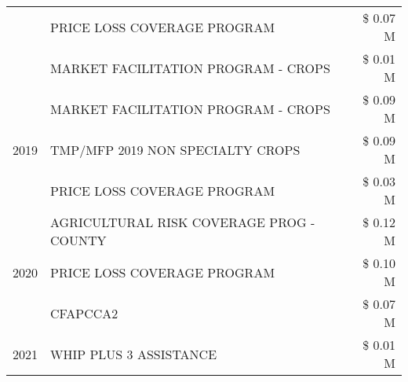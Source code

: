 \begin{tabular}{llr}
 & PRICE LOSS COVERAGE PROGRAM & \$ 0.07 M \\
 & MARKET FACILITATION PROGRAM - CROPS & \$ 0.01 M \\
\cline{1-3}
\multirow[t]{3}{*}{2019} & MARKET FACILITATION PROGRAM - CROPS & \$ 0.09 M \\
 & TMP/MFP 2019 NON SPECIALTY CROPS & \$ 0.09 M \\
 & PRICE LOSS COVERAGE PROGRAM & \$ 0.03 M \\
\cline{1-3}
\multirow[t]{3}{*}{2020} & AGRICULTURAL RISK COVERAGE PROG - COUNTY & \$ 0.12 M \\
 & PRICE LOSS COVERAGE PROGRAM & \$ 0.10 M \\
 & CFAPCCA2 & \$ 0.07 M \\
\cline{1-3}
2021 & WHIP PLUS 3 ASSISTANCE & \$ 0.01 M \\
\cline{1-3}
\bottomrule
\end{tabular}
